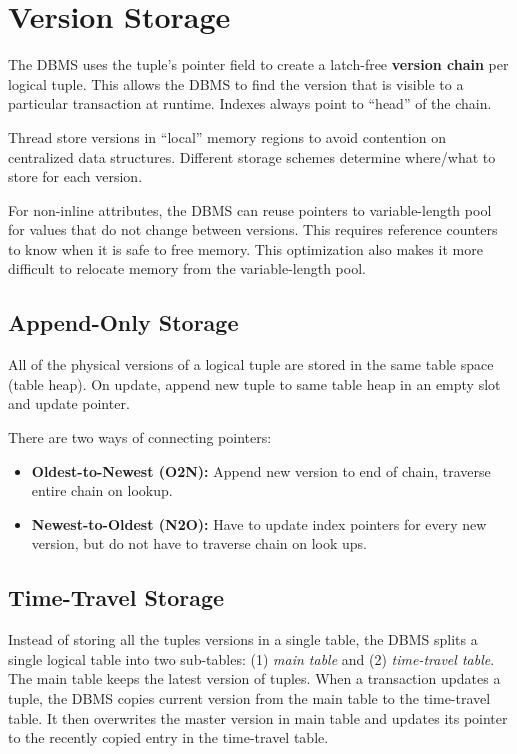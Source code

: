 \documentclass[11pt]{article}
\begin{document}
\section{Version Storage}
The DBMS uses the tuple's pointer field to create a latch-free \textbf{version chain} per logical 
tuple. This allows the DBMS to find the version that is visible to a particular transaction at 
runtime. Indexes always point to ``head'' of the chain.

Thread store versions in ``local'' memory regions to avoid contention on centralized data 
structures. Different storage schemes determine where/what to store for each version.

For non-inline attributes, the DBMS can reuse pointers to variable-length pool for values that do 
not change between versions. This requires reference counters to know when it is safe to free 
memory. This optimization also makes it more difficult to relocate memory from the variable-length 
pool.
    
\subsection*{Append-Only Storage}
All of the physical versions of a logical tuple are stored in the same table space 
(table heap). On update, append new tuple to same table heap in an empty slot and update pointer.

There are two ways of connecting pointers:

\begin{itemize}
    \item \textbf{Oldest-to-Newest (O2N):}
    Append new version to end of chain, traverse entire chain on lookup.

    \item \textbf{Newest-to-Oldest (N2O):}
    Have to update index pointers for every new version, but do not have to traverse chain on 
    look ups.
\end{itemize}

\subsection*{Time-Travel Storage}
Instead of storing all the tuples versions in a single table, the DBMS splits a single logical 
table into two sub-tables: (1) \textit{main table} and (2) \textit{time-travel table}. The main 
table keeps the latest version of tuples. When a transaction updates a tuple, the 
DBMS copies current version from the main table to the time-travel table. It then overwrites 
the master version in main table and updates its pointer to the recently copied entry in the 
time-travel table.
\end{document}
